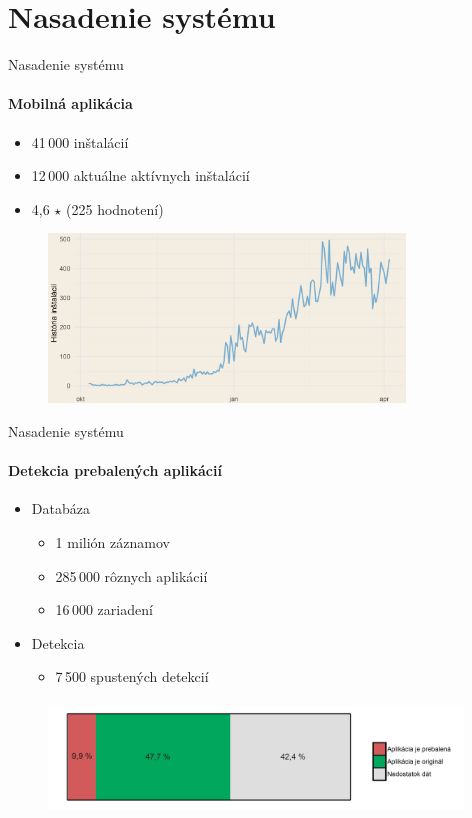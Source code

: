\documentclass{beamer}
\begin{document}
  \section{Nasadenie systému}  
  \begin{frame}[label=lists]{Nasadenie systému}
   	 \framesubtitle{Mobilná aplikácia}
  	\begin{itemize}
  		\item 41\,000 inštalácií
  		\item 12\,000 aktuálne aktívnych inštalácií
  		\item 4,6 $\star$ (225 hodnotení)
  	\end{itemize}
	\begin{figure}[htb]
	  	\begin{center}
    		\includegraphics[height=4.5cm]{images/grafy/ins_vyvoj_p.png}
  		\end{center}
	\end{figure}
  \end{frame}   
  
    \begin{frame}[label=lists]{Nasadenie systému}
   	 \framesubtitle{Detekcia prebalených aplikácií}

	\begin{itemize}
	\item Databáza
  		\begin{itemize}
	  		\item 1 milión záznamov
  			\item 285\,000  rôznych aplikácií
 			\item 16\,000 zariadení
	   	\end{itemize}
  	 \item Detekcia
  		 \begin{itemize}
  	   		\item 7\,500 spustených detekcií
	  	 \end{itemize}
  	 \end{itemize}
	\begin{figure}[htb]
	  	\begin{center}
    		\includegraphics[width=11cm, height=3cm]{images/grafy/obrazovky_p.png}
  		\end{center}
	\end{figure}
  \end{frame} 
\end{document}
